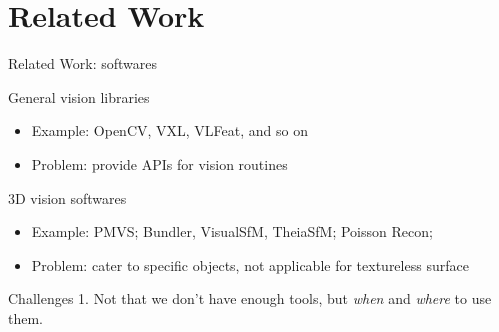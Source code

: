 \documentclass[10pt]{beamer}
\begin{document}
\section{Related Work}
\begin{frame}{Related Work: softwares}


\begin{exampleblock}{General vision libraries}
\begin{itemize}
  \item Example: OpenCV, VXL, VLFeat, and so on
  \item Problem: provide APIs for vision routines
\end{itemize}
\end{exampleblock}

\begin{exampleblock}{3D vision softwares}
  \begin{itemize}
    \item Example: PMVS; Bundler, VisualSfM, TheiaSfM; Poisson Recon;
    \item Problem: cater to specific objects, not applicable for textureless surface
  \end{itemize}
\end{exampleblock}

\begin{alertblock}{Challenges}
1. Not that we don't have enough tools, but \textit{when} and \textit{where} to use them. \\
\end{alertblock}

\end{frame}
\end{document}
